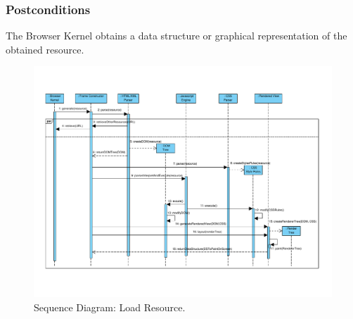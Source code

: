 \documentclass[prodmode,acmtecs]{acmsmall}
\begin{document}
\begin{shaded}
    \subsubsection*{Postconditions} The Browser Kernel obtains a data structure or graphical representation of the obtained resource.

    \end{shaded}

    \begin{landscape}
      \begin{figure}[h!t]
      \vspace*{-2cm}
          \centering
          \hspace*{-1cm}\includegraphics[scale=0.8]{figures/LoadResource-v2.pdf}
          \vspace*{-2.2cm}
          \caption{Sequence Diagram: Load Resource.}
          \label{fig:LoadResource}
      \end{figure}
    \end{landscape}

    
\end{document}
